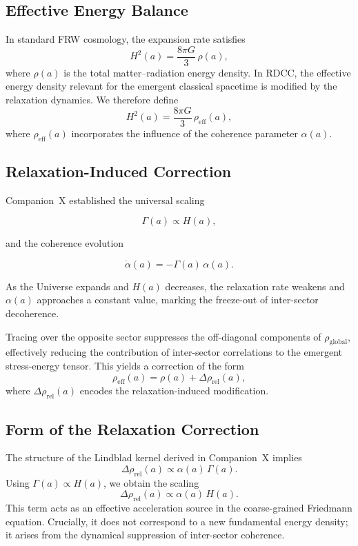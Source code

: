 \documentclass[11pt,a4paper]{article}
\newcommand{\rglobal}{\rho_{\mathrm{global}}}
\newcommand{\Ha}{H(a)}
\newcommand{\GammaR}{\Gamma}
\newcommand{\alphaR}{\alpha}
\begin{document}
\subsection{Effective Energy Balance}

In standard FRW cosmology, the expansion rate satisfies
\begin{equation}
H^{2}(a) = \frac{8\pi G}{3}\,\rho(a),
\end{equation}
where $\rho(a)$ is the total matter–radiation energy density. In RDCC, the
effective energy density relevant for the emergent classical spacetime is
modified by the relaxation dynamics. We therefore define
\begin{equation}
H^{2}(a) = \frac{8\pi G}{3}\,\rho_{\mathrm{eff}}(a),
\end{equation}
where $\rho_{\mathrm{eff}}(a)$ incorporates the influence of the coherence
parameter $\alphaR(a)$.

\subsection{Relaxation-Induced Correction}

Companion~X established the universal scaling


\[
\GammaR(a) \propto \Ha,
\]


and the coherence evolution


\[
\dot{\alphaR}(a) = -\GammaR(a)\,\alphaR(a).
\]


As the Universe expands and $\Ha$ decreases, the relaxation rate weakens and
$\alphaR(a)$ approaches a constant value, marking the freeze-out of inter-sector
decoherence.

Tracing over the opposite sector suppresses the off-diagonal components of
$\rglobal$, effectively reducing the contribution of inter-sector correlations to
the emergent stress-energy tensor. This yields a correction of the form
\begin{equation}
\rho_{\mathrm{eff}}(a)
    = \rho(a) + \Delta\rho_{\mathrm{rel}}(a),
\end{equation}
where $\Delta\rho_{\mathrm{rel}}(a)$ encodes the relaxation-induced modification.

\subsection{Form of the Relaxation Correction}

The structure of the Lindblad kernel derived in Companion~X implies
\begin{equation}
\Delta\rho_{\mathrm{rel}}(a)
    \propto \alphaR(a)\,\GammaR(a).
\end{equation}
Using $\GammaR(a) \propto \Ha$, we obtain the scaling
\begin{equation}
\Delta\rho_{\mathrm{rel}}(a)
    \propto \alphaR(a)\,\Ha.
\end{equation}
This term acts as an effective acceleration source in the coarse-grained
Friedmann equation. Crucially, it does not correspond to a new fundamental
energy density; it arises from the dynamical suppression of inter-sector
coherence.
\end{document}
